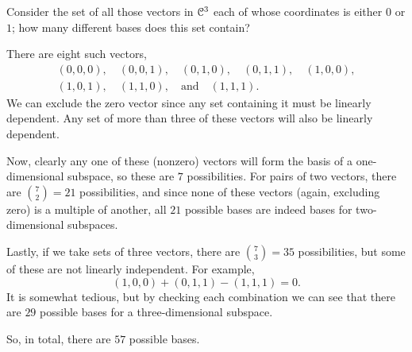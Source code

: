  Consider the set of all those vectors in $\mathcal{C}^3$ each of
whose coordinates is either $0$ or $1$; how many different bases does
this set contain?
\begin{solution}
  There are eight such vectors,
  \begin{multline*}
    (0,0,0),\quad (0,0,1),\quad (0,1,0), \quad (0,1,1), \quad (1,0,0), \\
    (1,0,1), \quad (1,1,0), \quad\text{and}\quad (1,1,1).
  \end{multline*}
  We can exclude the zero vector since any set containing it must be
  linearly dependent. Any set of more than three of these vectors will
  also be linearly dependent.

  Now, clearly any one of these (nonzero) vectors will form the basis
  of a one-dimensional subspace, so these are $7$ possibilities. For
  pairs of two vectors, there are $\binom72 = 21$ possibilities, and
  since none of these vectors (again, excluding zero) is a multiple of
  another, all $21$ possible bases are indeed bases for
  two-dimensional subspaces.

  Lastly, if we take sets of three vectors, there are $\binom73 = 35$
  possibilities, but some of these are not linearly independent. For
  example,
  \begin{equation*}
    (1,0,0) + (0,1,1) - (1,1,1) = 0.
  \end{equation*}
  It is somewhat tedious, but by checking each combination we can see
  that there are $29$ possible bases for a three-dimensional subspace.

  So, in total, there are $57$ possible bases.
\end{solution}
